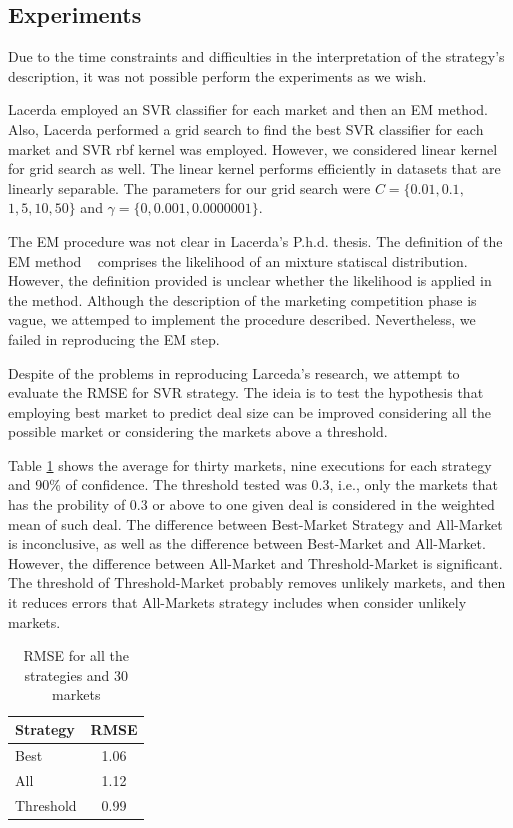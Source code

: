 \documentclass{acm_proc_article-sp}
\begin{document}
\subsection{Experiments}

Due to the time constraints and difficulties in the interpretation of 
 the strategy's description, it was not possible perform the 
experiments as we wish. 

Lacerda employed an SVR classifier for each market and then 
an EM method. Also, Lacerda performed 
a grid search to find the best SVR classifier for each market 
and SVR rbf kernel was employed. However, we considered linear 
kernel for grid search as well. The linear kernel performs  
efficiently in datasets that are linearly separable. The parameters for 
our grid search were $C = \{0.01,0.1,$$1,5,10,50\}$ and 
$\gamma = \{0,0.001,0.0000001\}$.


The EM procedure was not clear in Lacerda's P.h.d. thesis. The definition of 
the EM method ~\cite{hastie2009elements} comprises the likelihood 
of an mixture statiscal distribution. However, the definition 
provided is unclear whether the likelihood is applied in the 
method. Although the description of  the 
marketing competition phase is vague, we attemped to implement 
the procedure described. Nevertheless, we failed in reproducing 
the EM step.

Despite of the problems in reproducing Larceda's research, we 
attempt to evaluate the  RMSE for SVR strategy. The ideia is 
to test the hypothesis that employing best market to 
predict deal size can be improved considering all the possible 
market or considering the markets above a threshold.

Table \ref{rmsetable} shows the average for thirty markets,  
nine executions for each strategy and 90\% of confidence.
The threshold tested was $0.3$, i.e., 
only the markets that has the probility of $0.3$ or above to 
 one given deal is considered in the weighted mean of such deal. 
The difference between Best-Market 
Strategy and All-Market is 
inconclusive, as well as the difference between Best-Market and 
All-Market. However, the difference between All-Market and 
Threshold-Market is significant. The threshold of Threshold-Market 
probably removes unlikely markets, and then it reduces errors
that All-Markets strategy includes when consider unlikely 
markets. 


\begin{table}[H]
    \centering
    \caption{RMSE for all the strategies and 30 markets}
    \label{rmsetable}
    \begin{tabular}{lc} \hline
	Strategy & RMSE \\ \hline \hline
	Best & 1.06\\
        All & 1.12 \\
	Threshold & 0.99 \\ \hline
    \end{tabular}
\end{table}
\end{document}

